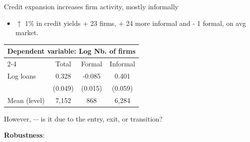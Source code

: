 \documentclass[aspectratio=169]{beamer}
\begin{document}
\begin{frame}{Credit expansion increases firm activity,  mostly informally} \label{main_result}

\begin{itemize}
    \item[$\Rightarrow$] $\uparrow$ 1\% in credit yields + 23 firms, + 24 more informal and - 1  formal, on avg market.
\end{itemize}
\begin{center}
    \begin{tabular}{lccc}
    \toprule
    \multicolumn{4}{c}{\textbf{Dependent variable}: Log Nb. of firms} \\
    \cmidrule(lr){2-4}
              & Total & Formal & Informal \\
    \midrule
    Log loans &  0.328  & -0.085  & 0.401 \\
              & (0.049) & (0.015) & (0.059) \\
    \midrule
    Mean (level) & 7,152 & 868 & 6,284 \\
    \bottomrule
    \end{tabular}
\end{center}

\vspace{5mm}
\pause

\begin{center}
    \large However, $\cdots$ is it due to the entry, exit, or transition?
\end{center}

\vspace{10mm}

\begin{center}
    \textbf{Robustness}: \quad \hyperlink{ols}{} \quad \hyperlink{unconcentrated}{} \quad \hyperlink{llm_level}{} \quad  \hyperlink{balance}{} \quad \hyperlink{placebo}{}
\end{center}

\end{frame}

\end{document}
